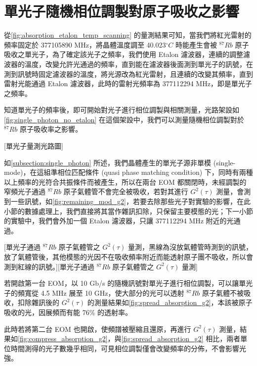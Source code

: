 \documentclass[class=NCU_thesis, crop=false]{standalone}
\begin{document}
\section{單光子隨機相位調製對原子吸收之影響}
從\cref{fig:absorption_etalon_temp_scanning} 的量測結果可知，當我們將紅光雷射的頻率固定於 377105890 MHz，將晶體溫度調至 40.023$^{\circ}C$ 時能產生會被 $^{87}Rb$ 原子吸收之單光子，為了確定該光子之頻率，我們使用 Etalon 濾波器，連續的調整濾波器的溫度，改變允許光通過的頻率，直到能在濾波器後面測到單光子的訊號，在測到訊號時固定濾波器的溫度，將光源改為紅光雷射，且連續的改變其頻率，直到雷射光能通過 Etalon 濾波器，此時的雷射光頻率為 377112294 MHz，即是單光子之頻率。

知道單光子的頻率後，即可開始對光子進行相位調製與相關測量，光路架設如\cref{fig:single_photon_no_etalon} 在這個架設中，我們可以測量隨機相位調製對於 $^{87}Rb$ 原子吸收率之影響。

[單光子量測光路圖]

如\cref{subsection:single_photon} 所述，我們晶體產生的單光子源非單模 (single-mode)，在這組準相位匹配條件 (quasi phase matching condition) 下，同時有兩種以上頻率的光符合共振條件而被產生，所以在兩台 EOM 都關閉時，未經調製的窄頻光子通過 $^{87}Rb$ 原子氣體管不會完全被吸收，若對其進行 $G^{2}(\tau)$ 測量，會測到一些訊號，如\cref{fig:remaining_mod_g2}，若要去除那些光子對實驗的影響，在此小節的數據處理上，我們直接將其當作雜訊扣除，只保留主要模態的光；下一小節的實驗中，我們會外加一個 Etalon 濾波器，只讓 377112294 MHz 附近的光通過。

[單光子通過 $^{87}Rb$ 原子氣體管之 $G^{2}(\tau)$ 量測，黑線為沒放氣體管時測到的訊號，放了氣體管後，其他模態的光因不在吸收頻率附近而能透射原子團不吸收，所以會測到紅線的訊號。][單光子通過 $^{87}Rb$ 原子氣體管之 $G^{2}(\tau)$ 量測]

若開啟第一台 EOM，以 10 Gb/s 的隨機訊號對單光子進行相位調製，可以讓單光子的頻寬從 4.5 MHz 展至 10 GHz，使大部分的光可以透射 $^{87}Rb$ 原子氣體不被吸收，扣除雜訊後的 $G^2(\tau)$ 的測量結果如\cref{fig:spread_absorption_g2}，本該被原子吸收的光，因展頻而有能 76\% 的透射率。

此時若將第二台 EOM 也開啟，使頻譜被壓縮且還原，再進行 $G^2(\tau)$ 測量，結果如\cref{fig:compress_absorption_g2}，與\cref{fig:spread_absorption_g2} 相比，兩者單位時間測得的光子數幾乎相同，可見相位調製僅會改變頻率的分佈，不會影響光強。
\end{document}
